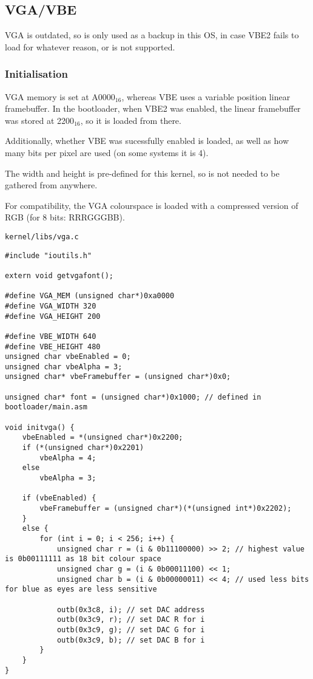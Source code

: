 \documentclass{article}
\begin{document}
\subsection{VGA/VBE}

VGA is outdated, so is only used as a backup in this OS, in case VBE2 fails
to load for whatever reason, or is not supported.

\subsubsection{Initialisation}

VGA memory is set at A0000$_{16}$, whereas VBE uses a variable position
linear framebuffer. In the bootloader, when VBE2 was enabled, the linear
framebuffer was stored at 2200$_{16}$, so it is loaded from there.

Additionally, whether VBE was sucessfully enabled is loaded, as well as
how many bits per pixel are used (on some systems it is 4).

The width and height is pre-defined for this kernel, so is not needed
to be gathered from anywhere.

For compatibility, the VGA colourspace is loaded with a compressed version
of RGB (for 8 bits: RRRGGGBB).

\begin{verbatim}
kernel/libs/vga.c
\end{verbatim}
\begin{verbatim}
#include "ioutils.h"

extern void getvgafont();

#define VGA_MEM (unsigned char*)0xa0000
#define VGA_WIDTH 320
#define VGA_HEIGHT 200

#define VBE_WIDTH 640
#define VBE_HEIGHT 480
unsigned char vbeEnabled = 0;
unsigned char vbeAlpha = 3;
unsigned char* vbeFramebuffer = (unsigned char*)0x0;

unsigned char* font = (unsigned char*)0x1000; // defined in bootloader/main.asm

void initvga() {
	vbeEnabled = *(unsigned char*)0x2200;
	if (*(unsigned char*)0x2201)
		vbeAlpha = 4;
	else
		vbeAlpha = 3;

	if (vbeEnabled) {
		vbeFramebuffer = (unsigned char*)(*(unsigned int*)0x2202);
	}
	else {
		for (int i = 0; i < 256; i++) {
			unsigned char r = (i & 0b11100000) >> 2; // highest value is 0b00111111 as 18 bit colour space
			unsigned char g = (i & 0b00011100) << 1;
			unsigned char b = (i & 0b00000011) << 4; // used less bits for blue as eyes are less sensitive

			outb(0x3c8, i); // set DAC address
			outb(0x3c9, r); // set DAC R for i
			outb(0x3c9, g); // set DAC G for i
			outb(0x3c9, b); // set DAC B for i
		}
	}
}
\end{verbatim}
\end{document}
